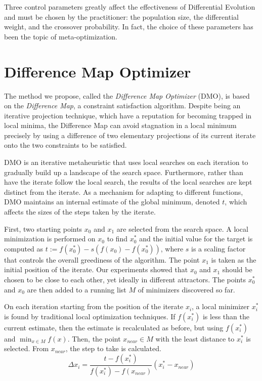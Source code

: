 \documentclass[12pt]{article}
\begin{document}
    Three control parameters greatly affect the effectiveness of Differential
    Evolution and must be chosen by the practitioner\cite{storn1997}: the
    population size, the differential weight, and the crossover probability.
    In fact, the choice of these parameters has been the topic of
    meta-optimization\cite{pedersen2010}.


\section{Difference Map Optimizer}

    The method we propose, called the \emph{Difference Map Optimizer} (DMO), is
    based on the \emph{Difference Map}, a constraint satisfaction algorithm.
    Despite being an iterative projection technique, which have a reputation
    for becoming trapped in local minima, the Difference Map can avoid
    stagnation in a local minimum precisely by using a difference of two
    elementary projections of its current iterate onto the two constraints to
    be satisfied.

    DMO is an iterative metaheuristic that uses local searches on each
    iteration to gradually build up a landscape of the search space.
    Furthermore, rather than have the iterate follow the local search, the
    results of the local searches are kept distinct from the iterate.
    As a mechanism for adapting to different functions, DMO maintains an
    internal estimate of the global minimum, denoted $t$, which affects the
    sizes of the steps taken by the iterate.

    First, two starting points $x_0$ and $x_1$ are selected from the search
    space.
    A local minimization is performed on $x_0$ to find $x_0^*$ and the
    initial value for the target is computed as
    $t := f(x_0^*) - s (f(x_0) - f(x_0^*))$,
    where $s$ is a scaling factor that controls the overall greediness of the
    algorithm.
    The point $x_1$ is taken as the initial position of the iterate. Our
    experiments showed that $x_0$ and $x_1$ should be chosen to be close to
    each other, yet ideally in different attractors.
    The points $x_0^*$ and $x_0$ are then added to a running list $M$ of
    minimizers discovered so far.

    On each iteration starting from the position of the iterate $x_i$, a local
    minimizer $x_i^*$ is found by traditional local optimization techniques.
    If $f(x_i^*)$ is less than the current estimate, then the estimate is
    recalculated as before, but using $f(x_i^*)$ and $\min_{x \in M} f(x)$.
    Then, the point $x_{near} \in M$ with the least distance to $x_i^*$ is
    selected.
    From $x_{near}$, the step to take is calculated.
    \begin{equation}
        \Delta x_i =
            \frac{t - f(x_i^*)}{f(x_i^*) - f(x_{near})} (x_i^* - x_{near})
        \label{eqn:dx}
    \end{equation}
\end{document}
